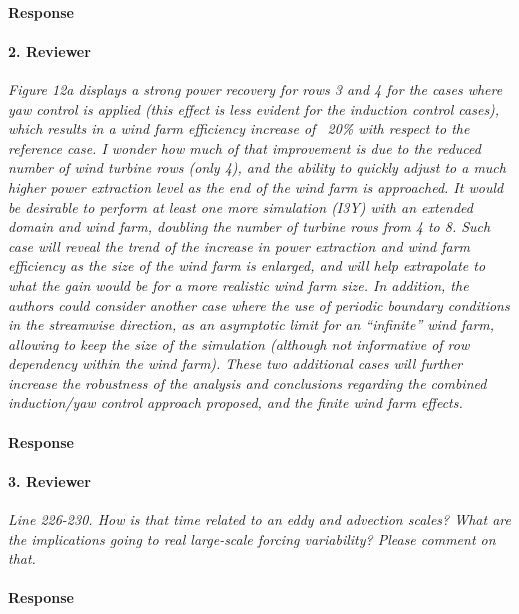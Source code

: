 \documentclass[]{article}
\begin{document}
\paragraph{Response} 


\hrulefill

\paragraph{2. Reviewer} \textit{Figure 12a displays a strong power recovery for rows 3 and 4 for the cases where yaw control is applied (this effect is less evident for the induction control cases), which results in a wind farm efficiency increase of ~20\% with respect to the reference case. I wonder how much of that improvement is due to the reduced number of wind turbine rows (only 4), and the ability to quickly adjust to a much higher power extraction level as the end of the wind farm is approached. It would be desirable to perform at least one more simulation (I3Y) with an extended domain and wind farm, doubling the number of turbine rows from 4 to 8. Such case will reveal the trend of the increase in power extraction and wind farm efficiency as the size of the wind farm is enlarged, and will help extrapolate to what the gain would be for a more realistic wind farm size. In addition, the authors could consider another case where the use of periodic boundary conditions in the streamwise direction, as an asymptotic limit for an “infinite” wind farm, allowing to keep the size of the simulation (although not informative of row dependency within the wind farm). These two additional cases will further increase the robustness of the analysis and conclusions regarding the combined induction/yaw control approach proposed, and the finite wind farm effects.}

\paragraph{Response} 

\hrulefill

\paragraph{3. Reviewer} \textit{Line 226-230. How is that time related to an eddy and advection scales? What are the implications going to real large-scale forcing variability? Please comment on that.}

\paragraph{Response} 
\end{document}
